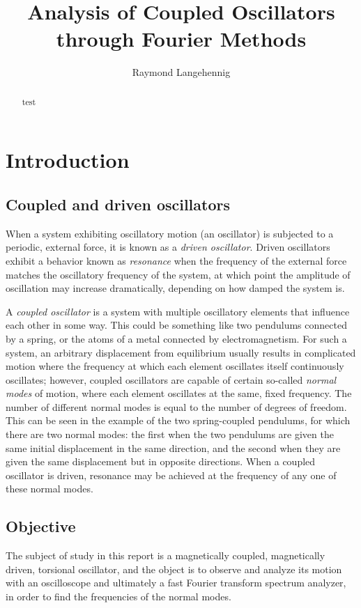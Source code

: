 \documentclass{article}
\title{Analysis of Coupled Oscillators through Fourier Methods}
\author{Raymond Langehennig}
\begin{document}
\maketitle

\begin{abstract}
    test
\end{abstract}

\section{Introduction}

\subsection{Coupled and driven oscillators}
When a system exhibiting oscillatory motion (an oscillator) is subjected to a periodic, external force, it is known as a \emph{driven oscillator}. Driven oscillators exhibit a behavior known as \emph{resonance} when the frequency of the external force matches the oscillatory frequency of the system, at which point the amplitude of oscillation may increase dramatically, depending on how damped the system is.

A \emph{coupled oscillator} is a system with multiple oscillatory elements that influence each other in some way. This could be something like two pendulums connected by a spring, or the atoms of a metal connected by electromagnetism. For such a system, an arbitrary displacement from equilibrium usually results in complicated motion where the frequency at which each element oscillates itself continuously oscillates; however, coupled oscillators are capable of certain so-called \emph{normal modes} of motion, where each element oscillates at the same, fixed frequency. The number of different normal modes is equal to the number of degrees of freedom. This can be seen in the example of the two spring-coupled pendulums, for which there are two normal modes: the first when the two pendulums are given the same initial displacement in the same direction, and the second when they are given the same displacement but in opposite directions. When a coupled oscillator is driven, resonance may be achieved at the frequency of any one of these normal modes.

\subsection{Objective}
The subject of study in this report is a magnetically coupled, magnetically driven, torsional oscillator, and the object is to observe and analyze its motion with an oscilloscope and ultimately a fast Fourier transform spectrum analyzer, in order to find the frequencies of the normal modes.
\end{document}
